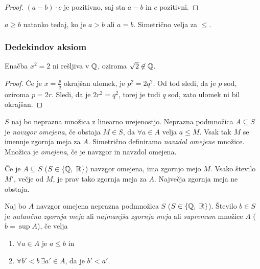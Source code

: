 \documentclass[12pt, a4paper]{article}
\begin{document}
\begin{proof}
$(a-b)\cdot c$ je pozitivno, saj sta $a-b$ in $c$ pozitivni.
\end{proof}

\begin{definicija}
$a\geq b$ natanko tedaj, ko je $a>b$ ali $a=b$. Simetrično velja za $\leq$.
\end{definicija}

\newpage

\subsubsection{Dedekindov aksiom}


\begin{trditev}\label{o3}
Enačba $x^2=2$ ni rešljiva v $\mathbb{Q}$, oziroma $\sqrt{2}\not\in\mathbb{Q}$.
\end{trditev}

\begin{proof}
Če je $x=\frac{p}{q}$ okrajšan ulomek, je $p^2=2q^2$. Od tod sledi, da je $p$ sod, oziroma $p=2r$. Sledi, da je $2r^2=q^2$, torej je tudi $q$ sod, zato ulomek ni bil okrajšan.
\end{proof}

\begin{definicija}
$S$ naj bo neprazna množica z linearno urejenostjo. Neprazna podmnožica $A\subseteq S$ je \emph{navzgor omejena}, če obstaja $M\in S$, da $\forall a\in A$ velja $a\leq M$. Vsak tak $M$ se imenuje zgornja meja za $A$. Simetrično definiramo \emph{navzdol omejene} množice. Množica je \emph{omejena}, če je navzgor in navzdol omejena.
\end{definicija}

\begin{opomba}
Če je $A\subseteq S$ ($S\in\left\{\mathbb{Q},~\mathbb{R}\right\}$) navzgor omejena, ima zgornjo mejo $M$. Vsako število $M'$, večje od $M$, je prav tako zgornja meja za $A$. Največja zgornja meja ne obstaja.
\end{opomba}

\begin{definicija}
Naj bo $A$ navzgor omejena neprazna podmnožica $S$ ($S\in\left\{\mathbb{Q},~\mathbb{R}\right\}$). Število $b\in S$ je \emph{natančna zgornja meja} ali \emph{najmanjša zgornja meja} ali \emph{supremum} množice $A$ ($b=\sup A$), če velja

\begin{enumerate}[label=\roman*)]
\item $\forall a\in A$ je $a\leq b$ in
\item $\forall b'<b~\exists a'\in A$, da je $b'<a'$.
\end{enumerate}
\end{definicija}
\end{document}
